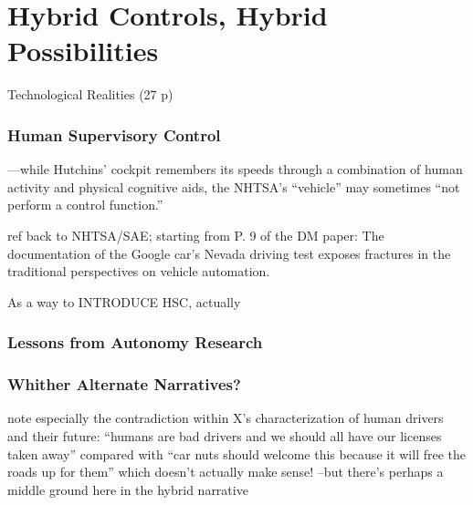 \chapter{Hybrid Controls, Hybrid Possibilities}

Technological Realities (27 p)



\subsection{Human Supervisory Control}

—while Hutchins' cockpit
remembers its speeds through a combination of human activity and
physical cognitive aids,\cite{???} the NHTSA's “vehicle” may sometimes “not
perform a control function.”\cite{???}

ref back to NHTSA/SAE; starting from P. 9 of the DM paper: The documentation of the Google car's Nevada driving test
exposes fractures in the traditional perspectives on vehicle
automation.\cite{???} 

As a way to INTRODUCE HSC, actually

\subsection{Lessons from Autonomy Research}

\subsection{Whither Alternate Narratives?}

note especially the contradiction within X's characterization of human
drivers and their future: ``humans are bad drivers and we should all
have our licenses taken away'' compared with ``car nuts should welcome
this because it will free the roads up for them'' which doesn't
actually make sense!
--but there's perhaps a middle ground here in the hybrid narrative

